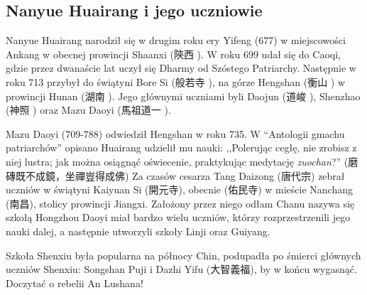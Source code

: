\subsection{Nanyue Huairang i jego uczniowie}
Nanyue Huairang narodził się w drugim roku ery Yifeng (677) w miejscowości Ankang w obecnej prowincji Shaanxi (陝西 ).
W roku 699 udał się do Caoqi, gdzie przez dwanaście lat uczył się Dharmy od Szóstego Patriarchy.
Następnie w roku 713 przybył do świątyni Bore Si (般若寺 ), na górze Hengshan (衡山 ) w prowincji Hunan (湖南 ).
Jego głównymi uczniami byli Daojun (道峻 ), Shenzhao (神照 ) oraz Mazu Daoyi (馬祖道一 ).

Mazu Daoyi (709-788) odwiedził Hengshan w roku 735.
W ``Antologii gmachu patriarchów'' opisano
Huairang udzielił mu nauki: ,,Polerując cegłę, nie zrobisz z niej lustra; jak można osiągnąć oświecenie, praktykując medytację \textit{zuochan}?'' (磨磚既不成鏡，坐禪豈得成佛)
Za czasów cesarza Tang Daizong (唐代宗) zebrał uczniów w świątyni Kaiyuan Si (開元寺), obecnie (佑民寺) w mieście Nanchang (南昌), stolicy prowincji Jiangxi.
Założony przez niego odłam Chanu nazywa się szkołą Hongzhou
Daoyi miał bardzo wielu uczniów, którzy rozprzestrzenili jego nauki dalej, a następnie utworzyli szkoły Linji oraz Guiyang.

Szkoła Shenxiu była popularna na północy Chin, podupadła po śmierci głównych uczniów Shenxiu: Songshan Puji i Dazhi Yifu (大智義福), by w końcu wygasnąć. %
Doczytać o rebelii An Lushana!

